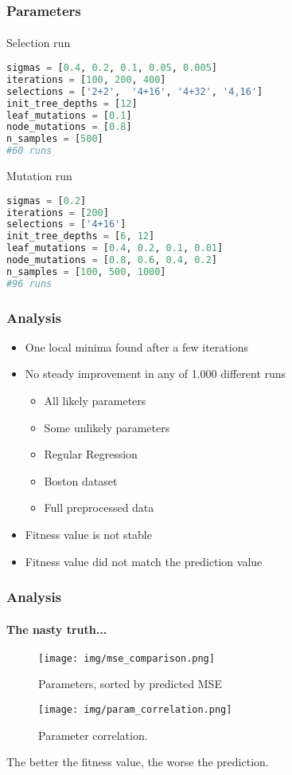 \documentclass{beamer}
\begin{document}
\begin{frame}[fragile]
\frametitle{Parameters}
\framesubtitle{}
\begin{block}{Selection run}
\begin{lstlisting}[language=Python]
sigmas = [0.4, 0.2, 0.1, 0.05, 0.005]
iterations = [100, 200, 400]
selections = ['2+2',  '4+16', '4+32', '4,16']
init_tree_depths = [12]
leaf_mutations = [0.1]
node_mutations = [0.8]
n_samples = [500]
#60 runs
\end{lstlisting}
\end{block}

\begin{block}{Mutation run}
\begin{lstlisting}[language=Python]
sigmas = [0.2]
iterations = [200]
selections = ['4+16']
init_tree_depths = [6, 12]
leaf_mutations = [0.4, 0.2, 0.1, 0.01]
node_mutations = [0.8, 0.6, 0.4, 0.2]
n_samples = [100, 500, 1000]
#96 runs
\end{lstlisting}
\end{block}
\end{frame}


\begin{frame}[fragile]
\frametitle{Analysis}

\begin{itemize}
\item One local minima found after a few iterations
\item No steady improvement in any of 1.000 different runs

\begin{itemize}
\item All likely parameters
\item Some unlikely parameters 
\item Regular Regression
\item Boston dataset
\item Full preprocessed data
\end{itemize}

\item Fitness value is not stable
\item Fitness value did not match the prediction value
\end{itemize}


\end{frame}


\begin{frame}[fragile]
\frametitle{Analysis}
\framesubtitle{The nasty truth...}
\begin{figure}[H]

\begin{minipage}{.5\textwidth}
  \centering
  \texttt{[image: img/mse\_comparison.png]}
  \caption{Parameters, sorted by predicted MSE}
\end{minipage}%
\begin{minipage}{.5\textwidth}
  \centering
  \texttt{[image: img/param\_correlation.png]}
  \caption{Parameter correlation.}
\end{minipage}%
\end{figure}
\hbox{}
\hbox{}
The better the fitness value, the worse the prediction.

\end{frame}
\end{document}
